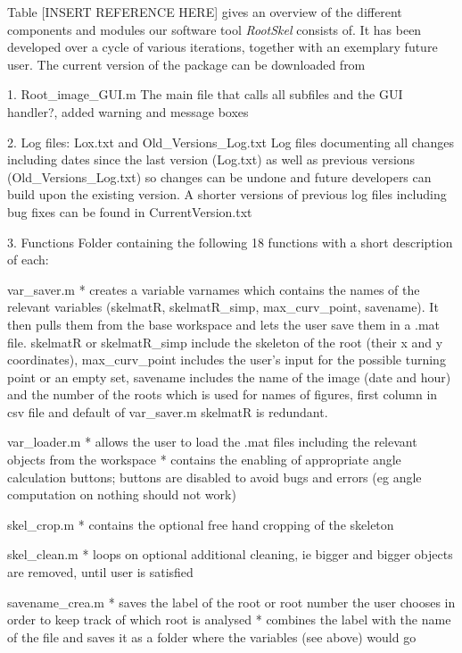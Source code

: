 %


Table [INSERT REFERENCE HERE] gives an overview of the different components and modules our software tool \textit{RootSkel} consists of. It has been developed over a cycle of various iterations, together with an exemplary future user. 
The current version of the package can be downloaded from %

1. Root_image_GUI.m
The main file that calls all subfiles and the GUI handler?,
added warning and message boxes

2. Log files: Lox.txt and Old_Versions_Log.txt 
Log files documenting all changes including dates since the last version (Log.txt) as well as previous versions (Old_Versions_Log.txt) so changes can be undone and future developers can build upon the existing version. A shorter versions of previous log files including bug fixes can be found in CurrentVersion.txt

3. Functions 
Folder containing the following 18 functions with a short description of each:

var_saver.m
* creates a variable varnames which contains the names of the relevant variables (skelmatR, skelmatR_simp, max_curv_point, savename). It then pulls them from the base workspace and lets the user save them in a .mat file. skelmatR or skelmatR_simp include the skeleton of the root (their x and y coordinates), max_curv_point includes the user’s input for the possible turning point or an empty set, savename includes the name of the image (date and hour) and the number of the roots which is used for names of figures, first column in csv file and default of var_saver.m
skelmatR is redundant.

var_loader.m
* allows the user to load the .mat files including the relevant objects from the workspace
* contains the enabling of appropriate angle calculation buttons; buttons are disabled to avoid bugs and errors (eg angle computation on nothing should not work)

skel_crop.m
* contains the optional free hand cropping of the skeleton

skel_clean.m
* loops on optional additional cleaning, ie bigger and bigger objects are removed, until user is satisfied

savename_crea.m
* saves the label of the root or root number the user chooses in order to keep track of which root is analysed
* combines the label with the name of the file and saves it as a folder where the variables (see above) would go


